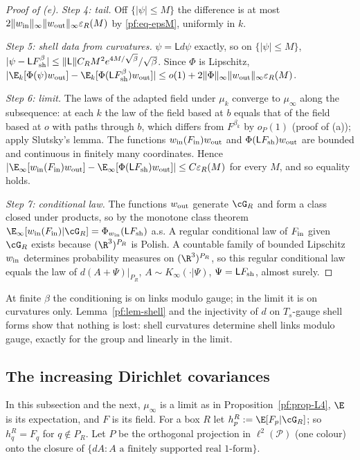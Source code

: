 \begin{proof}[Proof of (e)]
\emph{Step 4: tail.} Off $\{|\psi|\le M\}$ the difference is at most $2\|w_{\rm in}\|_\infty\|w_{\rm out}\|_\infty\varepsilon_R(M)$ by \eqref{pf:eq-epsM}, uniformly in $k$.

\emph{Step 5: shell data from curvatures.} $\psi=\mathsf Ld\psi$ exactly, so on $\{|\psi|\le M\}$, $|\psi-\mathsf LF^{\beta}_{\rm sh}|\le\|\mathsf L\|C_RM^2e^{4M/\sqrt\beta}/\sqrt\beta$. Since $\Phi$ is Lipschitz, $|\E_k[\Phi(\psi)w_{\rm out}]-\E_k[\Phi(\mathsf LF^\beta_{\rm sh})w_{\rm out}]|\le o(1)+2\|\Phi\|_\infty\|w_{\rm out}\|_\infty\varepsilon_R(M)$.

\emph{Step 6: limit.} The laws of the adapted field under $\mu_k$ converge to $\mu_\infty$ along the subsequence: at each $k$ the law of the field based at $b$ equals that of the field based at $o$ with paths through $b$, which differs from $F^{\beta_k}$ by $o_P(1)$ (proof of (a)); apply Slutsky's lemma. The functions $w_{\rm in}(F_{\rm in})w_{\rm out}$ and $\Phi(\mathsf LF_{\rm sh})w_{\rm out}$ are bounded and continuous in finitely many coordinates. Hence
$|\E_\infty[w_{\rm in}(F_{\rm in})w_{\rm out}]-\E_\infty[\Phi(\mathsf LF_{\rm sh})w_{\rm out}]|\le C\varepsilon_R(M)$ for every $M$, and so equality holds.

\emph{Step 7: conditional law.} The functions $w_{\rm out}$ generate $\cG_R$ and form a class closed under products, so by the monotone class theorem $\E_\infty[w_{\rm in}(F_{\rm in})|\cG_R]=\Phi_{w_{\rm in}}(\mathsf LF_{\rm sh})$ a.s. A regular conditional law of $F_{\rm in}$ given $\cG_R$ exists because $(\R^3)^{P_R}$ is Polish. A countable family of bounded Lipschitz $w_{\rm in}$ determines probability measures on $(\R^3)^{P_R}$, so this regular conditional law equals the law of $d(A+\Psi)|_{P_R}$, $A\sim K_\infty(\cdot|\Psi)$, $\Psi=\mathsf LF_{\rm sh}$, almost surely.
\end{proof}

At finite $\beta$ the conditioning is on links modulo gauge; in the limit it is on curvatures only. Lemma~\ref{pf:lem-shell} and the injectivity of $d$ on $T_s$-gauge shell forms show that nothing is lost: shell curvatures determine shell links modulo gauge, exactly for the group and linearly in the limit.

\subsection{The increasing Dirichlet covariances}\label{pf:sec-D}

In this subsection and the next, $\mu_\infty$ is a limit as in Proposition~\ref{pf:prop-L4}, $\E$ is its expectation, and $F$ is its field. For a box $R$ let $h^R_p:=\E[F_p|\cG_R]$; so $h^R_q=F_q$ for $q\notin P_R$.
Let $P$ be the orthogonal projection in $\ell^2(\mathcal P)$ (one colour) onto the closure of $\{dA:A\text{ a finitely supported real }1\text{-form}\}$.

